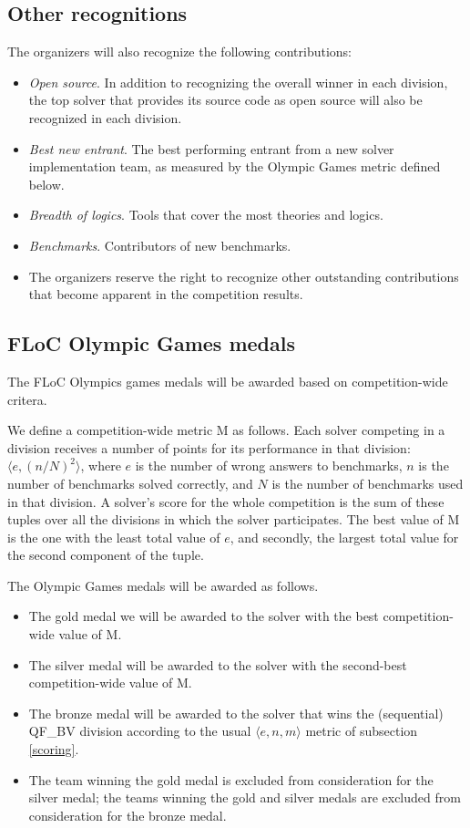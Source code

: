 \documentclass[12pt]{article}
\begin{document}
\subsection{Other recognitions}
The organizers will also recognize the following contributions:
\begin{itemize}
\item {\em Open source}. In addition to recognizing the overall
winner in each division, the top solver that provides its source code as open source will also be
recognized in each division.  
\item {\em Best new entrant}. The best performing entrant from a new solver implementation team, as measured by the Olympic Games metric defined below.
\item {\em Breadth of logics}. Tools that cover the most theories and logics.
\item {\em Benchmarks}. Contributors of new benchmarks.
\item The organizers reserve the right to recognize other outstanding contributions that become apparent in the competition results.
\end{itemize}

\subsection{FLoC Olympic Games medals}

The FLoC Olympics games medals will be awarded based on competition-wide critera.

We define a competition-wide metric M as follows. Each solver competing in a division receives a number of points for its performance in that division: $\langle e,(n/N)^2 \rangle$, where $e$ is the number of wrong answers to benchmarks, $n$ is the number of benchmarks solved correctly, and $N$ is the number of benchmarks used in that division. A solver's score for the whole competition is the sum of these tuples over all the 
divisions in which the solver participates. The best value of M is the one with the least total value of $e$, and secondly, the largest total value for the second component of the tuple.

The Olympic Games medals will be awarded as follows.
\begin{itemize}
\item The gold medal we will be awarded to the solver with the best competition-wide value of M.
\item The silver medal will be awarded to the solver with the second-best competition-wide value of M.
\item The bronze medal will be awarded to the solver that wins the (sequential) QF\_BV division according to the usual $\langle e,n,m\rangle$ metric of subsection \ref{scoring}. 
\item The team winning the gold medal is excluded from consideration for the silver medal; the teams winning the gold and silver medals are excluded from consideration for the bronze medal.
\end{itemize}
\end{document}
